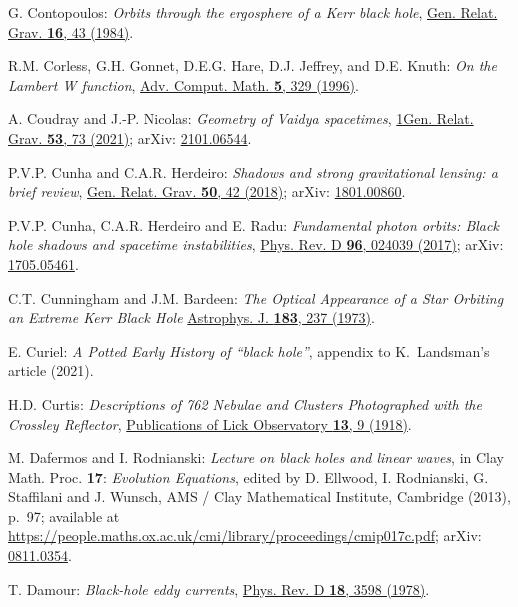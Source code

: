 \begin{thebibliography}{123}
G. Contopoulos:
{\em Orbits through the ergosphere of a Kerr black hole},
\href{https://doi.org/10.1007/BF00764017}{Gen. Relat. Grav. {\bf 16}, 43 (1984)}.

R.M. Corless, G.H. Gonnet, D.E.G. Hare, D.J. Jeffrey, and D.E. Knuth:
{\em On the Lambert W function},
\href{https://doi.org/10.1007/BF02124750}{Adv. Comput. Math. {\bf 5}, 329 (1996)}.

A. Coudray and J.-P. Nicolas:
{\em Geometry of Vaidya spacetimes},
\href{https://doi.org/10.1007/s10714-021-02839-7}{1Gen. Relat. Grav. {\bf 53}, 73 (2021)};
arXiv: \href{https://arxiv.org/abs/2101.06544}{2101.06544}.

P.V.P. Cunha and C.A.R. Herdeiro:
{\em Shadows and strong gravitational lensing: a brief review},
\href{https://doi.org/10.1007/s10714-018-2361-9}{Gen. Relat. Grav. {\bf 50}, 42 (2018)};
arXiv: \href{https://arxiv.org/abs/1801.00860}{1801.00860}.

P.V.P. Cunha, C.A.R. Herdeiro and E. Radu:
{\em Fundamental photon orbits: Black hole shadows and spacetime instabilities},
\href{https://doi.org/10.1103/PhysRevD.96.024039}{Phys. Rev. D {\bf 96}, 024039 (2017)};
arXiv: \href{https://arxiv.org/abs/1705.05461}{1705.05461}.

C.T. Cunningham and J.M. Bardeen:
{\em The Optical Appearance of a Star Orbiting an Extreme Kerr Black Hole}
\href{https://doi.org/10.1086/152223}{Astrophys. J. {\bf 183}, 237 (1973)}.

E. Curiel:
{\em A Potted Early History of ``black hole''},
appendix to K.~Landsman's article \cite{Lands21} (2021).

H.D. Curtis:
{\em Descriptions of 762 Nebulae and Clusters Photographed with the Crossley Reflector},
\href{https://ui.adsabs.harvard.edu/abs/1918PLicO..13....9C}{Publications of Lick Observatory {\bf 13}, 9 (1918)}.

M. Dafermos and I. Rodnianski: {\em Lecture on black holes and linear waves},
in  Clay Math. Proc. {\bf 17}: {\em Evolution Equations}, edited by
D. Ellwood, I. Rodnianski, G. Staffilani and J. Wunsch, AMS / Clay Mathematical Institute,
Cambridge (2013), p.~97; available at
\url{https://people.maths.ox.ac.uk/cmi/library/proceedings/cmip017c.pdf};
arXiv: \href{https://arxiv.org/abs/0811.0354}{0811.0354}.

T. Damour: {\em Black-hole eddy currents},
\href{https://doi.org/10.1103/PhysRevD.18.3598}{Phys. Rev. D {\bf 18}, 3598 (1978)}.


\end{thebibliography}
